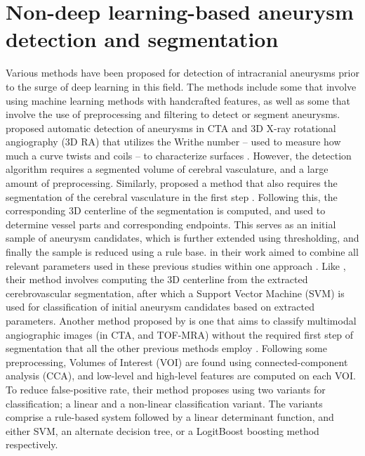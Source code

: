 \section{Non-deep learning-based aneurysm detection and segmentation}
Various methods have been proposed for detection of intracranial aneurysms prior to the surge of deep learning in this field. The methods include some that involve using machine learning methods with handcrafted features, as well as some that involve the use of preprocessing and filtering to detect or segment aneurysms. \citeauthor{Lauric2010} proposed automatic detection of aneurysms in CTA and 3D X-ray rotational angiography (3D RA) that utilizes the Writhe number -- used to measure how much a curve twists and coils -- to characterize surfaces \cite{Lauric2010}. However, the detection algorithm requires a segmented volume of cerebral vasculature, and a large amount of preprocessing. Similarly, \citeauthor{Yang2011} proposed a method that also requires the segmentation of the cerebral vasculature in the first step \cite{Yang2011}. Following this, the corresponding 3D centerline of the segmentation is computed, and used to determine vessel parts and corresponding endpoints. This serves as an initial sample of aneurysm candidates, which is further extended using thresholding, and finally the sample is reduced using a rule base. \citeauthor{Suniaga2012} in their work aimed to combine all relevant parameters used in these previous studies within one approach \cite{Suniaga2012}. Like \citeauthor{Yang2011}, their method involves computing the 3D centerline from the extracted cerebrovascular segmentation, after which a Support Vector Machine (SVM) is used for classification of initial aneurysm candidates based on extracted parameters. Another method proposed by \citeauthor{Hentschke2014} is one that aims to classify multimodal angiographic images (in CTA, and TOF-MRA) without the required first step of segmentation that all the other previous methods employ \cite{Hentschke2014}. Following some preprocessing, Volumes of Interest (VOI) are found using connected-component analysis (CCA), and low-level and high-level features are computed on each VOI. To reduce false-positive rate, their method proposes using two variants for classification; a linear and a non-linear classification variant. The variants comprise a rule-based system followed by a linear determinant function, and either SVM, an alternate decision tree, or a LogitBoost boosting method respectively. 

